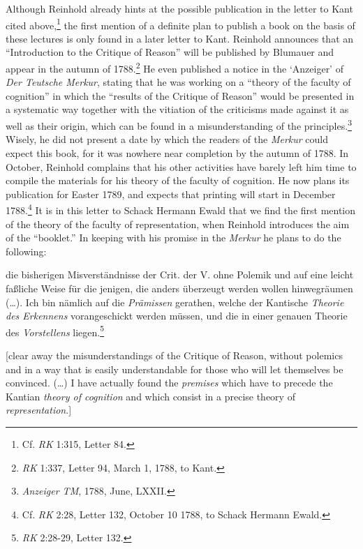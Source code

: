  Although Reinhold already hints at the possible publication in the letter to Kant cited above,\footnote{ Cf. \textit{RK} 1:315, Letter 84.} the first mention of a definite plan to publish a book on the basis of these lectures is only found in a later letter to Kant. Reinhold announces that an ``Introduction to the Critique of Reason'' will be published by Blumauer and appear in the autumn of 1788.\footnote{ \textit{RK} 1:337, Letter 94, March 1, 1788, to Kant. } He even published a notice in the `Anzeiger' of \textit{Der Teutsche Merkur}, stating that he was working on a ``theory of the faculty of cognition'' in which the ``results of the Critique of Reason'' would be presented in a systematic way together with the vitiation of the criticisms made against it as well as their origin, which can be found in a misunderstanding of the principles.\footnote{ \textit{Anzeiger TM}, 1788, June, LXXII. } Wisely, he did not present a date by which the readers of the \textit{Merkur} could expect this book, for it was nowhere near completion by the autumn of 1788. In October, Reinhold complains that his other activities have barely left him time to compile the materials for his theory of the faculty of cognition. He now plans its publication for Easter 1789, and expects that printing will start in December 1788.\footnote{ Cf. \textit{RK} 2:28, Letter 132, October 10 1788, to Schack Hermann Ewald. } It is in this letter to Schack Hermann Ewald that we find the first mention of the theory of the faculty of representation, when Reinhold introduces the aim of the ``booklet.'' In keeping with his promise in the \textit{Merkur} he plans to do the following: 

die bisherigen Misverst\"{a}ndnisse der Crit. der V. ohne Polemik und auf eine leicht fa\ss{}liche Weise f\"{u}r die jenigen, die anders \"{u}berzeugt werden wollen hinwegr\"{a}umen (\ldots ). Ich bin n\"{a}mlich auf die \textit{Pr\"{a}missen }gerathen, welche der Kantische \textit{Theorie des Erkennens} vorangeschickt werden m\"{u}ssen, und die in einer genauen Theorie des \textit{Vorstellens} liegen.\footnote{\label{footnote:_Ref211313789} \textit{RK} 2:28{-}29, Letter 132.}

[clear away the misunderstandings of the Critique of Reason, without polemics and in a way that is easily understandable for those who will let themselves be convinced. (\ldots ) I have actually found the \textit{premises} which have to precede the Kantian \textit{theory of cognition} and which consist in a precise theory of \textit{representation}.]

